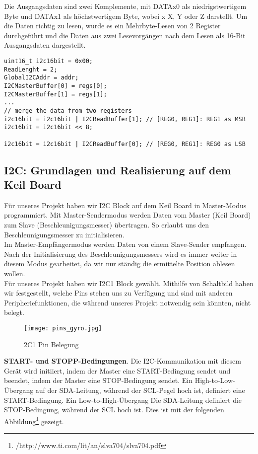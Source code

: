 Die Ausgangsdaten sind zwei Komplemente, mit DATAx0 als niedrigstwertigem Byte und DATAx1 als höchstwertigem Byte, wobei x X, Y oder Z darstellt. Um die Daten richtig zu lesen, wurde es ein Mehrbyte-Lesen von 2 Register durchgeführt und die Daten aus zwei Lesevorgängen nach dem Lesen als 16-Bit Ausgangsdaten dargestellt. 

\begin{lstlisting}
uint16_t i2c16bit = 0x00;
ReadLenght = 2;
GlobalI2CAddr = addr;
I2CMasterBuffer[0] = regs[0];
I2CMasterBuffer[1] = regs[1];
...
// merge the data from two registers
i2c16bit = i2c16bit | I2CReadBuffer[1]; // [REG0, REG1]: REG1 as MSB
i2c16bit = i2c16bit << 8;

i2c16bit = i2c16bit | I2CReadBuffer[0]; // [REG0, REG1]: REG0 as LSB

\end{lstlisting}

\subsection{I2C: Grundlagen und Realisierung auf dem Keil Board}
Für unseres Projekt haben wir I2C Block auf dem Keil Board in Master-Modus programmiert. Mit Master-Sendermodus werden Daten vom Master (Keil Board) zum Slave (Beschleunigungsmesser) übertragen. So erlaubt uns den Beschleunigungsmesser zu initialisieren. \\

Im Master-Empfängermodus werden Daten von einem Slave-Sender empfangen. Nach der Initialisierung des Beschleunigungsmessers wird es immer weiter in diesem Modus gearbeitet, da wir nur ständig die ermittelte Position ablesen wollen. \\

Für unseres Projekt haben wir I2C1 Block gewählt. Mithilfe von Schaltbild haben wir festgestellt, welche Pins stehen uns zu Verfügung und sind mit anderen Peripheriefunktionen, die während unseres Projekt notwendig sein könnten, nicht belegt. 

\begin{figure}[!hb]
	\centering
	\texttt{[image: pins\_gyro.jpg]}
	\caption[I2C1 Pin Belegung]{2C1 Pin Belegung}
	\label{fig:i2cpins}
\end{figure}

\textbf{START- und STOPP-Bedingungen}. Die I2C-Kommunikation mit diesem Gerät wird initiiert, indem der Master eine START-Bedingung sendet und beendet, indem der Master eine STOP-Bedingung sendet. Ein High-to-Low-Übergang auf der SDA-Leitung, während der SCL-Pegel hoch ist, definiert eine START-Bedingung. Ein Low-to-High-Übergang Die SDA-Leitung definiert die STOP-Bedingung, während der SCL hoch ist. Dies ist mit der folgenden Abbildung\footnote{/http://www.ti.com/lit/an/slva704/slva704.pdf} gezeigt. 

